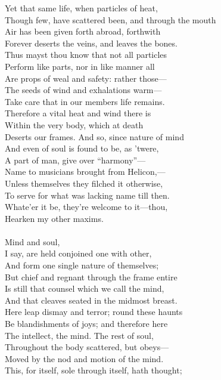 Yet that same life, when particles of heat,\\
Though few, have scattered been, and through the mouth\\
Air has been given forth abroad, forthwith\\
Forever deserts the veins, and leaves the bones.\\
Thus mayst thou know that not all particles\\
Perform like parts, nor in like manner all\\
Are props of weal and safety: rather those—\\
The seeds of wind and exhalations warm—\\
Take care that in our members life remains.\\
Therefore a vital heat and wind there is\\
Within the very body, which at death\\
Deserts our frames. And so, since nature of mind\\
And even of soul is found to be, as 'twere,\\
A part of man, give over ``harmony''—\\
Name to musicians brought from Helicon,—\\
Unless themselves they filched it otherwise,\\
To serve for what was lacking name till then.\\
Whate'er it be, they're welcome to it—thou,\\
Hearken my other maxims.\\
\\
Mind and soul,\\
I say, are held conjoined one with other,\\
And form one single nature of themselves;\\
But chief and regnant through the frame entire\\
Is still that counsel which we call the mind,\\
And that cleaves seated in the midmost breast.\\
Here leap dismay and terror; round these haunts\\
Be blandishments of joys; and therefore here\\
The intellect, the mind. The rest of soul,\\
Throughout the body scattered, but obeys—\\
Moved by the nod and motion of the mind.\\
This, for itself, sole through itself, hath thought;\\
